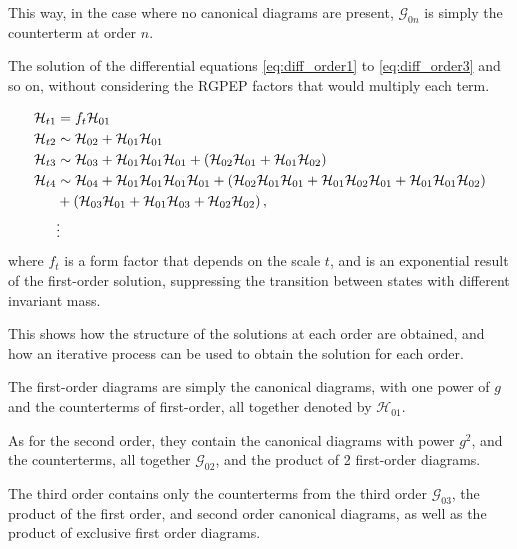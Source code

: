 \documentclass[11pt,a4paper,twoside,pdf]{article}
\numberwithin{equation}{section}
\begin{document}
This way, in the case where no canonical diagrams are present, $\mathcal{G}_{0 n}$ is simply the
counterterm at order \( n \).

The solution of the differential equations \eqref{eq:diff_order1} to \eqref{eq:diff_order3} 
and so on, without considering the RGPEP factors that would multiply each term.

\begin{align}
    \mathcal{H}_{t1} & = f_{t} \mathcal{H}_{01} \\
    \mathcal{H}_{t2} & \sim \mathcal{H}_{02} + \mathcal{H}_{01} 
    \mathcal{H}_{01}\\
    \mathcal{H}_{t3} & \sim \mathcal{H}_{03} + \mathcal{H}_{01} \mathcal{H}_{01}
    \mathcal{H}_{01} + \left( \mathcal{H}_{02} \mathcal{H}_{01} + 
    \mathcal{H}_{01} \mathcal{H}_{02} \right)\\
    \mathcal{H}_{t4} & \sim \mathcal{H}_{04} + \mathcal{H}_{01} \mathcal{H}_{01}
    \mathcal{H}_{01} \mathcal{H}_{01} + \left( \mathcal{H}_{02} 
    \mathcal{H}_{01} \mathcal{H}_{01} +  \mathcal{H}_{01} \mathcal{H}_{02}
    \mathcal{H}_{01} + \mathcal{H}_{01} \mathcal{H}_{01} \mathcal{H}_{02} \right) \nonumber\\
    & + \left( \mathcal{H}_{03} \mathcal{H}_{01} + \mathcal{H}_{01} 
    \mathcal{H}_{03} + \mathcal{H}_{02}\mathcal{H}_{02} \right),\\
    &\vdots  \nonumber
\end{align}
where $f_{t}$ is a form factor that depends on the scale $t$, and is an exponential 
result of the first-order solution, suppressing the transition between states with 
different invariant mass.

This shows how the structure of the solutions at each order are obtained, and how an iterative 
process can be used to obtain the solution for each order.

The first-order diagrams are simply the canonical diagrams, with one power of $g$ and the 
counterterms of first-order, all together denoted by $\mathcal{H}_{01}$. 

As for the second order, 
they contain the canonical diagrams with power $g^2$, and the counterterms,
all together $\mathcal{G}_{02}$, and the product of 2 first-order diagrams. 

The 
third order contains only the counterterms from the third order $\mathcal{G}_{03}$,
the product of the first order, and second order canonical diagrams, as well as the 
product of exclusive first order diagrams.
\end{document}
